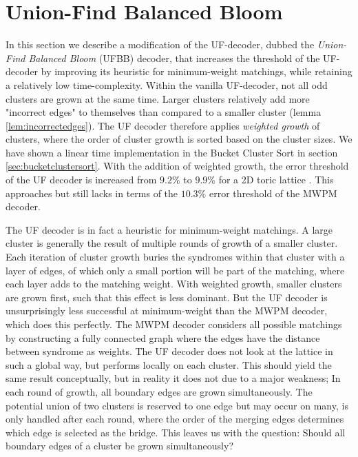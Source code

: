 \section{Union-Find Balanced Bloom}

In this section we describe a modification of the UF-decoder, dubbed the \emph{Union-Find Balanced Bloom} (UFBB) decoder, that increases the threshold of the UF-decoder by improving its heuristic for minimum-weight matchings, while retaining a relatively low time-complexity. Within the vanilla UF-decoder, not all odd clusters are grown at the same time. Larger clusters relatively add more "incorrect edges" to themselves than compared to a smaller cluster (lemma \ref{lem:incorrectedges}). The UF decoder therefore applies \emph{weighted growth} of clusters, where the order of cluster growth is sorted based on the cluster sizes. We have shown a linear time implementation in the Bucket Cluster Sort in section \ref{sec:bucketclustersort}. With the addition of weighted growth, the error threshold of the UF decoder is increased from $9.2\%$ to $9.9\%$ for a 2D toric lattice \cite{delfosse2017almost}. This approaches but still lacks in terms of the $10.3\%$ error threshold of the MWPM decoder.

The UF decoder is in fact a heuristic for minimum-weight matchings. A large cluster is generally the result of multiple rounds of growth of a smaller cluster. Each iteration of cluster growth buries the syndromes within that cluster with a layer of edges, of which only a small portion will be part of the matching, where each layer adds to the matching weight. With weighted growth, smaller clusters are grown first, such that this effect is less dominant. But the UF decoder is unsurprisingly less successful at minimum-weight than the MWPM decoder, which does this perfectly. The MWPM decoder considers all possible matchings by constructing a fully connected graph where the edges have the distance between syndrome as weights. The UF decoder does not look at the lattice in such a global way, but performs locally on each cluster. This should yield the same result conceptually, but in reality it does not due to a major weakness; In each round of growth, all boundary edges are grown simultaneously. The potential union of two clusters is reserved to one edge but may occur on many, is only handled after each round, where the order of the merging edges determines which edge is selected as the bridge. This leaves us with the question: Should all boundary edges of a cluster be grown simultaneously?

